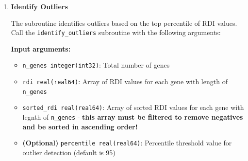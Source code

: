 \begin{enumerate}
\begin{enumerate}
\begin{itemize}
                    \item \texttt{stack\_right integer(int32)}: Stack array for sorting
                          with length of \texttt{n\_genes}
                  \end{itemize}
                  
                  \textbf{Output arguments:}
                  \begin{itemize}
                    \item \texttt{rdi real(real64)}: Array of RDI values for each gene
                          with length of \texttt{n\_genes}
                  \end{itemize}
                  \begin{lstlisting}[language=Fortran, caption={Compute Relative Distance Index (RDI)}]
call compute_rdi(n_genes, distances, gene_to_fam, dscale, rdi, &
        sorted_rdi, perm, stack_left, stack_right)
                  \end{lstlisting}
                  
            \item \textbf{Identify Outliers}
                  
                  The subroutine identifies outliers based on the top percentile of RDI
                  values. Call the \texttt{identify\_outliers} subroutine with the following
                  arguments:
                  
                  \textbf{Input arguments:}
                  \begin{itemize}
                    \item \texttt{n\_genes integer(int32)}: Total number of genes
                          
                    \item \texttt{rdi real(real64)}: Array of RDI values for each gene
                          with length of \texttt{n\_genes}
                          
                    \item \texttt{sorted\_rdi real(real64)}: Array of sorted RDI values
                          for each gene with legnth of \texttt{n\_genes} - \textbf{this
                            array must be filtered to remove negatives and be sorted in
                          ascending order!}
                          
                    \item \textbf{(Optional)} \texttt{percentile real(real64)}:
                          Percentile threshold value for outlier detection (default is 95)
                  \end{itemize}
                  

\end{enumerate}
\end{enumerate}
